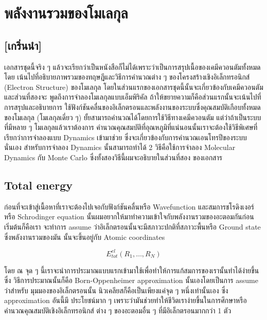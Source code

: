 
\chapter{พลังงานรวมของโมเลกุล}

\section{[เกริ่นนำ]}

เอกสารชุดนี้จริง ๆ แล้วจะเรียกว่าเป็นหนังสือก็ไม่ได้เพราะว่าเป็นการสรุปเนื้อของเคมีควอนตัมทั้งหมดโดย%
เน้นไปที่อธิบายภาพรวมของทฤษฎีและวิธีการคำนวณต่าง ๆ ของโครงสร้างเชิงอิเล็กทรอนิกส์ (Electron 
Structure) ของโมเลกุล โดยในส่วนแรกของเอกสารชุดนี้นั้นจะเกี่ยวข้องกับเคมีควอนตัมและส่วนที่สองจะ%
พูดถึงการจำลองโมเลกุลแบบเอ็มพิริคัล ถ้าให้ขยายความก็คือส่วนแรกนั้นจะเน้นไปที่การสรุปและอธิบายการ%
ใช้ฟังก์ชันคลื่นของอิเล็กตรอนและพลังงานของระบบซึ่งคุณสมบัติเกือบทั้งหมดของโมเลกุล (โมเลกุลเดี่ยว ๆ) 
ยั้ยสามารถคำนวณได้โดยการใช้วิธีทางเคมีควอนตัม แต่ว่าถ้าเป็นระบบที่มีหลาย ๆ โมเลกุลแล้วเราต้องการ%
คำนวณคุณสมบัติที่อุณหภูมิที่แน่นอนนั้นเราจะต้องใช้วิธีพิเศษที่เรียกว่าการจำลองแบบ Dynamics เข้ามาช่วย%
ซึ่งจะเกี่ยวข้องกับการคำนวณเอนโทรปีของระบบนั่นเอง สำหรับการจำลอง Dynamics นั้นสามารถทำได้ 2 
วิธีคือใช้การจำลอง Molecular Dynamics กับ Monte Carlo ซึ่งทั้งสองวิธีนี้ผมจะอธิบายในส่วนที่สอง%
ของเอกสาร

\section{Total energy}

ก่อนที่จะเข้าสู่เนื้อหาที่เราจะต้องไปเจอกับฟังก์ชันคลื่นหรือ Wavefunction และสมการชโรดิงเงอร์หรือ 
Schrodinger equation นั้นผมอยากให้มาทำความเข้าใจกับพลังงานรวมของอะตอมกันก่อน เริ่มต้นก็คือเรา%
จะทำการ assume ว่าอิเล็กตรอนนั้นจะมีสภาวะปกติที่สภาวะพื้นหรือ Ground state ซึ่งพลังงานรวมของมัน%
นั้นจะขึ้นอยู่กับ Atomic coordinates

\begin{equation}
    E^{el}_{tot}(R_{1}, \dots, R_{N})
\end{equation}

โดย ณ จุด ๆ นี้เราจะนำการประมาณแบบแรกเข้ามาใช้เพื่อทำให้การแก้สมการของเรานั้นทำได้ง่ายขึ้นซึ่ง%
วิธีการประมาณนั้นก็คือ Born-Oppenheimer approximation นั้นเองโดยเป็นการ assume ว่าสำหรับ%
มุมมองของอิเล็กตรอนนั้น นิวเคลียสก็คือเป็นเพียงแค่จุด ๆ หนึ่งเท่านั้นเอง ซึ่ง approximation อันนี้มี%
ประโยชน์มาก ๆ เพราะว่ามันช่วยทำให้ชีวิตเราง่ายขึ้นในการศึกษาหรือคำนวณคุณสมบัติเชิงอิเล็กทรอนิกส์%
ต่าง ๆ ของอะตอมอื่น ๆ ที่มีอิเล็กตรอนมากกว่า 1 ตัว

